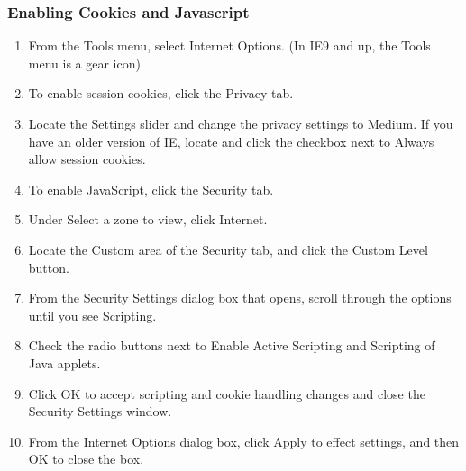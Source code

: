 \documentclass[hidelinks,english]{article}
\begin{document}
            \subsubsection{Enabling Cookies and Javascript}
            \begin{enumerate}
                \item From the Tools menu, select Internet Options. (In IE9 and up, the Tools menu is a gear icon)
                \item To enable session cookies, click the Privacy tab.
                \item Locate the Settings slider and change the privacy settings to Medium. If you have an older version of IE, locate and click the checkbox next to Always allow session cookies.
                \item To enable JavaScript, click the Security tab.
                \item Under Select a zone to view, click Internet.
                \item Locate the Custom area of the Security tab, and click the Custom Level button.
                \item From the Security Settings dialog box that opens, scroll through the options until you see Scripting.
                \item Check the radio buttons next to Enable Active Scripting and Scripting of Java applets.
                \item Click OK to accept scripting and cookie handling changes and close the Security Settings window.
                \item From the Internet Options dialog box, click Apply to effect settings, and then OK to close the box.
            \end{enumerate}
\end{document}
